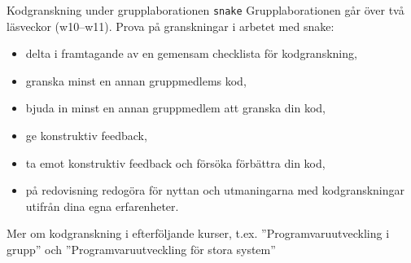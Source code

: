 
\begin{Slide}{Kodgranskning under grupplaborationen \texttt{snake}}
Grupplaborationen  går över två läsveckor (w10--w11). Prova på granskningar i arbetet med snake:
\begin{itemize}
\item delta i framtagande av en gemensam checklista för kodgranskning,
\item granska minst en annan gruppmedlems kod,
\item bjuda in minst en annan gruppmedlem att granska din kod,
\item ge konstruktiv feedback,
\item ta emot konstruktiv feedback och försöka förbättra din kod,
\item på redovisning redogöra för nyttan och utmaningarna med kodgranskningar utifrån dina egna erfarenheter.
\end{itemize}
Mer om kodgranskning i efterföljande kurser, t.ex. ''Programvaruutveckling i grupp'' och ''Programvaruutveckling för stora system''
\end{Slide}
